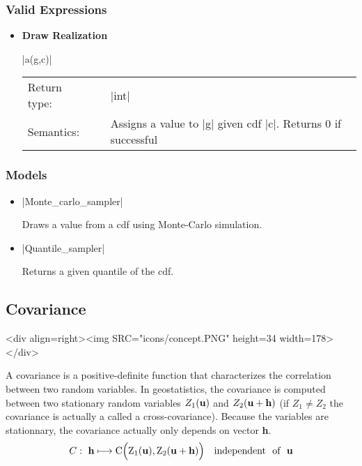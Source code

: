 \documentclass[12pt,twoside]{report}
\newcommand{\gstat}{geostatistics}
\newcommand{\loc}[1]{{\bf #1}}
\newcommand{\mloc}[1]{\rm{\bf #1}}
\begin{document}
 

\htmlrule[CLEAR=all]  \subsubsection*{Valid Expressions}
\begin{itemize}
\item {\bf Draw Realization}

  |a(g,c)|

  \begin{tabular}[!h]{l p{1cm} p{10cm}}
    Return type: & & |int|\\
    Semantics: & & Assigns a value to |g| given cdf |c|. Returns 0 if successful\\ 
  \end{tabular}
\end{itemize}


\htmlrule[CLEAR=all]  \subsubsection*{Models}
\begin{itemize}
\item |Monte_carlo_sampler|

Draws a value from a cdf using Monte-Carlo simulation.

\item |Quantile_sampler|

Returns a given quantile of the cdf. 

\end{itemize}




% 
\subsection{Covariance}
\label{concept:covariance}
\begin{htmlonly}
<div align=right><img SRC="icons/concept.PNG" height=34 width=178></div>
\end{htmlonly}


A covariance is a positive-definite function that characterizes the correlation between two random variables. In \gstat, the covariance is computed between two stationary random variables $Z_1(\mloc{u})$ and $Z_2(\mloc{u}+\mloc{h})$ (if $Z_1 \ne Z_2$ the covariance is actually a called a cross-covariance). Because the variables are stationnary, the covariance actually only depends on vector \loc{h}. 
\begin{displaymath}
C: \ \mloc{h} \longmapsto C \Big(Z_1(\mloc{u}),Z_2(\mloc{u}+\mloc{h}) \Big) \quad \textrm{independent \ of \ \loc{u}}
\end{displaymath}
\end{document}
